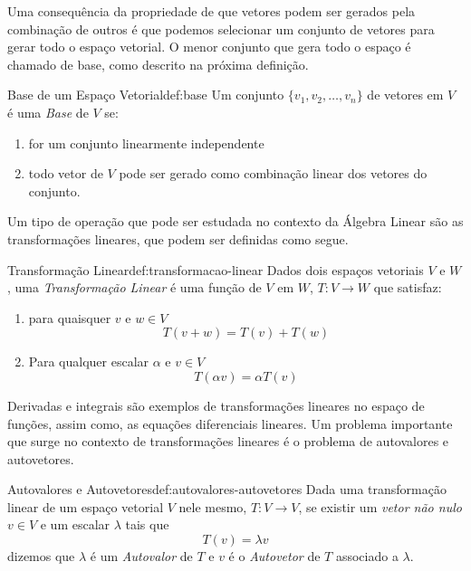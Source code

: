 Uma consequência da propriedade de que vetores podem ser gerados pela combinação
de outros é que podemos selecionar um conjunto de vetores para gerar todo o
espaço vetorial. O menor conjunto que gera todo o espaço é chamado de
base, como descrito na próxima definição.

\begin{definicao}{Base de um Espaço Vetorial}{def:base}
  Um conjunto \(\{v_1, v_2, \dots, v_n\}\) de vetores em $V$ é uma
  \emph{Base} de $V$ se:
  \begin{enumerate}
    \item for um conjunto linearmente independente
    \item todo vetor de $V$ pode ser gerado como combinação linear dos
          vetores do conjunto.
  \end{enumerate}
\end{definicao}

Um tipo de operação que pode ser estudada no contexto da Álgebra Linear são
as transformações lineares, que podem ser definidas como segue.

\begin{definicao}{Transformação Linear}{def:transformacao-linear}
  Dados dois espaços vetoriais $V$ e $W$, uma
  \emph{Transformação Linear} é uma função de
  $V$ em $W$, \(T:V\to W\) que satisfaz:
  \begin{enumerate}
    \item para quaisquer $v$ e $w\in V$
    \[
      T(v+w) = T(v) + T(w)
    \]
    \item Para qualquer escalar $\alpha$ e $v\in V$
    \[
      T(\alpha v) = \alpha T(v)
    \]
  \end{enumerate}
\end{definicao}

Derivadas e integrais são exemplos de transformações lineares no espaço de funções,
assim como, as equações diferenciais lineares. Um problema importante que
surge no contexto de transformações lineares é o problema de autovalores e autovetores.

\begin{definicao}{Autovalores e Autovetores}{def:autovalores-autovetores}
  Dada uma transformação linear de um espaço vetorial $V$ nele mesmo,
  \(T:V\to V\), se existir um \emph{vetor não nulo} $v\in V$
  e um escalar $\lambda$ tais que
  \[
    T(v) = \lambda v
  \]
  dizemos que $\lambda$ é um \emph{Autovalor} de $T$ e
  $v$ é o \emph{Autovetor} de $T$ associado a $\lambda$.
\end{definicao}

